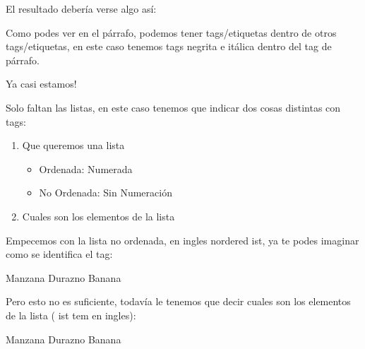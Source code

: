 \documentclass[letterpaper,10pt,spanish]{sphinxmanual}
\begin{document}
El resultado debería verse algo así:

\begin{figure}[htbp]
\centering

\noindent{}
\end{figure}

Como podes ver en el párrafo, podemos tener tags/etiquetas dentro de otros tags/etiquetas, en este caso tenemos tags negrita e itálica dentro del tag de párrafo.

Ya casi estamos!

Solo faltan las listas, en este caso tenemos que indicar dos cosas distintas con tags:
\begin{enumerate}
\item {} 
Que queremos una lista
\begin{itemize}
\item {} 
Ordenada: Numerada

\item {} 
No Ordenada: Sin Numeración

\end{itemize}

\item {} 
Cuales son los elementos de la lista

\end{enumerate}

Empecemos con la lista no ordenada, en ingles  nordered  ist, ya te podes imaginar como se identifica el tag:

%
\begin{sphinxVerbatim}[commandchars=\\\{\}]
Manzana
Durazno
Banana
\end{sphinxVerbatim}

Pero esto no es suficiente, todavía le tenemos que decir cuales son los elementos de la lista ( ist  tem en ingles):

%
\begin{sphinxVerbatim}[commandchars=\\\{\}]
        Manzana
        Durazno
        Banana
\end{sphinxVerbatim}
\end{document}
